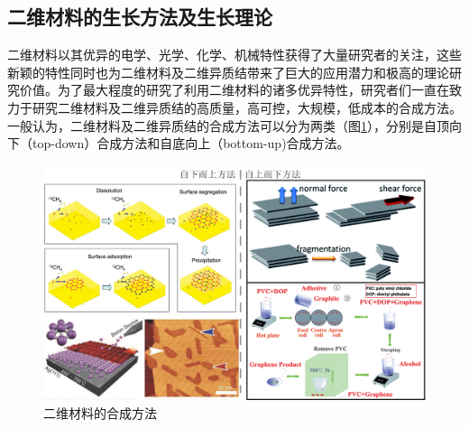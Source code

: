 \subsection{二维材料的生长方法及生长理论}
    二维材料以其优异的电学、光学、化学、机械特性获得了大量研究者的关注，这些新颖的特性同时也为二维材料及二维异质结带来了巨大的应用潜力和极高的理论研究价值。为了最大程度的研究了利用二维材料的诸多优异特性，研究者们一直在致力于研究二维材料及二维异质结的高质量，高可控，大规模，低成本的合成方法。一般认为，二维材料及二维异质结的合成方法可以分为两类（图\ref{fig:intro_2DMS_growth}），分别是自顶向下（top-down）合成方法和自底向上（bottom-up)合成方法。

    \begin{figure}[htb]
        \includegraphics{pic/INTRO_growth_upAndDown.png}
        \caption{二维材料的合成方法}
        \label{fig:intro_2DMS_growth}
    \end{figure}

